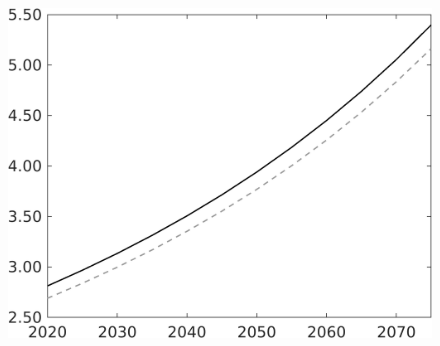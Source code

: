 \documentclass[12pt]{article}
\begin{document}
\begin{figure}[h!!]
\begin{minipage}[]{0.32\textwidth}
	\end{minipage}		
	\begin{minipage}[]{0.32\textwidth}
		\includegraphics[width=1\textwidth]{../../codding_model/own_basedOnFried/optimalPol_010922_revision/figures/all_13Sept22/CompTaul_LFBAU_Reg0_wh_spillover0_nsk0_xgr1_knspil0_sep1_countec0_GovRev0_etaa0.79_lgd0.png}
	\end{minipage}	
\end{figure}
\end{document}
